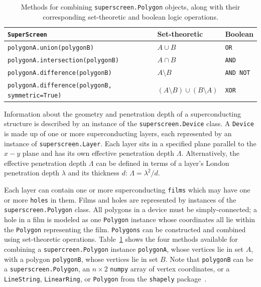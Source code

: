 \documentclass[final,3p,times,twocolumn]{elsarticle}
\newcommand{\inline}[1]{\texttt{#1}\xspace}
\newcommand{\SuperScreen}{\inline{SuperScreen}}
\begin{document}
\begin{table}
\centering
\begin{tabular}{|l|l|l|}
\hline
\SuperScreen                             & Set-theoretic  & Boolean   \\ \hline \hline
\inline{polygonA.union(polygonB)}        & $A\cup B$      & \inline{OR}      \\
\inline{polygonA.intersection(polygonB)} & $A\cap B$      & \inline{AND}     \\
\inline{polygonA.difference(polygonB)}   & $A\setminus B$ & \inline{AND NOT} \\
\inline{polygonA.difference(polygonB, symmetric=True)} & $(A\setminus B)\cup(B\setminus A)$ & \inline{XOR} \\ \hline
\end{tabular}
\caption{Methods for combining \inline{superscreen.Polygon} objects, along with their corresponding set-theoretic and boolean logic operations.}
\label{table:polygon}
\end{table}

Information about the geometry and penetration depth of a superconducting structure is described by an instance of the \inline{superscreen.Device} class. A \inline{Device} is made up of one or more superconducting layers, each represented by an instance of  \inline{superscreen.Layer}. Each layer sits in a specified plane parallel to the $x-y$ plane and has its own effective penetration depth $\Lambda$. Alternatively, the effective penetration depth $\Lambda$ can be defined in terms of a layer's London penetration depth $\lambda$ and its thickness $d$: $\Lambda=\lambda^2/d$.

Each layer can contain one or more superconducting \inline{films} which may have one or more \inline{holes} in them. Films and holes are represented by instances of the \inline{superscreen.Polygon} class. All polygons in a device must be simply-connected; a hole in a film is modeled as one \inline{Polygon} instance whose coordinates all lie within the \inline{Polygon} representing the film. \inline{Polygons} can be constructed and combined using set-theoretic operations. Table~\ref{table:polygon} shows the four methods available for combining a \inline{supercreen.Polygon} instance \inline{polygonA}, whose vertices lie in set $A$, with a polygon \inline{polygonB}, whose vertices lie in set $B$. Note that \inline{polygonB} can be a \inline{superscreen.Polygon}, an $n\times 2$ \inline{numpy} array of vertex coordinates, or a \inline{LineString}, \inline{LinearRing}, or \inline{Polygon} from the \inline{shapely} package~\cite{shapely}.
\end{document}
